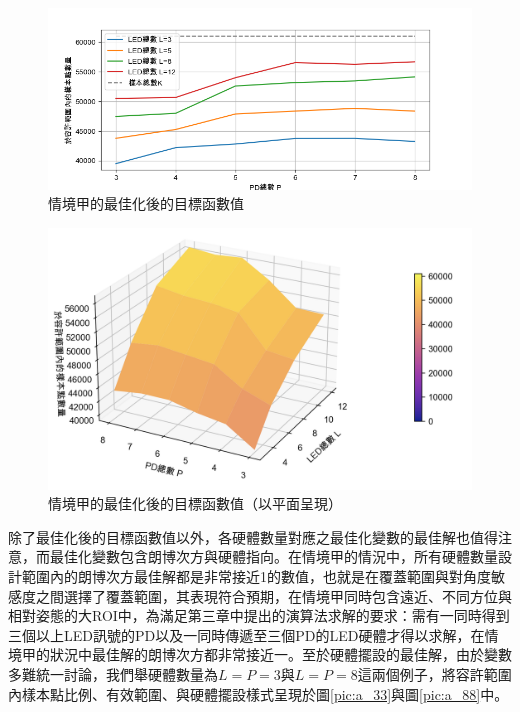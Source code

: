     \begin{figure}[htpb]
        \centering
        \includegraphics[width=15cm]{ch5pic/optimize_A.png}
        \caption{情境甲的最佳化後的目標函數值}
        \label{pic:opt_A_line}
    \end{figure}

    \begin{figure}[htpb]
        \centering
        \includegraphics[width=15cm]{ch5pic/surface_opt_A.png}
        \caption{情境甲的最佳化後的目標函數值（以平面呈現）}
        \label{pic:opt_A_surface}
    \end{figure}

    除了最佳化後的目標函數值以外，各硬體數量對應之最佳化變數的最佳解也值得注意，而最佳化變數包含朗博次方與硬體指向。在情境甲的情況中，所有硬體數量設計範圍內的朗博次方最佳解都是非常接近1的數值，也就是在覆蓋範圍與對角度敏感度之間選擇了覆蓋範圍，其表現符合預期，在情境甲同時包含遠近、不同方位與相對姿態的大ROI中，為滿足第三章中提出的演算法求解的要求：需有一同時得到三個以上LED訊號的PD以及一同時傳遞至三個PD的LED硬體才得以求解，在情境甲的狀況中最佳解的朗博次方都非常接近一。至於硬體擺設的最佳解，由於變數多難統一討論，我們舉硬體數量為$L=P=3$與$L=P=8$這兩個例子，將容許範圍內樣本點比例、有效範圍、與硬體擺設樣式呈現於圖\ref{pic:a_33}與圖\ref{pic:a_88}中。

